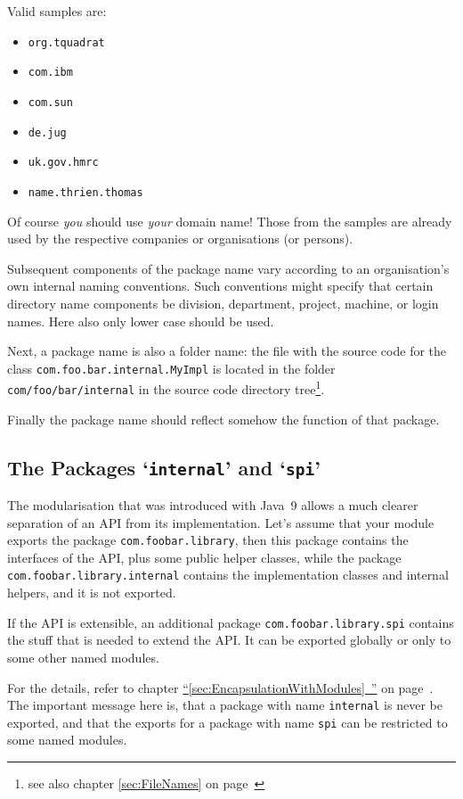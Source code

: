 \documentclass[11pt,a4paper, titlepage, parskip=half, headsepline, footsepline, cleardoublepage=current, headheight=1cm]{scrbook}
\newcommand*{\tqfullvref}[1]{\hyperref[{#1}]{“\ref*{#1}~\nameref*{#1}”} on page~\pageref{#1}}
\newcommand*{\tqvref}[1]{\hyperref[{#1}]{\ref*{#1}} on page~\pageref{#1}}
\begin{document}
Valid samples are:
\begin{itemize}[nosep]
\item\verb#org.tquadrat#
\item\verb#com.ibm#
\item\verb#com.sun#
\item\verb#de.jug#
\item\verb#uk.gov.hmrc#
\item\verb#name.thrien.thomas#
\end{itemize}

Of course \textit{you} should use \textit{your} domain name! Those from the samples are already used by the respective companies or organisations (or persons).

Subsequent components of the package name vary according to an organisation's own internal naming conventions. Such conventions might specify that certain directory name components be division, department, project, machine, or login names. Here also only lower case should be used.

Next, a package name is also a folder name: the file with the source code for the class \lstinline|com.foo.bar.internal.MyImpl| is located in the folder \verb#com/foo/bar/internal# in the source code directory tree\footnote{see also chapter \tqvref{sec:FileNames}}.

Finally the package name should reflect somehow the function of that package.


\subsection{The Packages ‘\lstinline|internal|’ and ‘\lstinline|spi|’}
The modularisation that was introduced with Java~9 allows a much clearer separation of an API from its implementation. Let's assume that your module exports the package \lstinline|com.foobar.library|, then this package contains the interfaces of the API, plus some public helper classes, while the package \lstinline|com.foobar.library.internal| contains the implementation classes and internal helpers, and it is not exported.

If the API is extensible, an additional package \lstinline|com.foobar.library.spi| contains the stuff that is needed to extend the API. It can be exported globally or only to some other named modules.

For the details, refer to chapter \tqfullvref{sec:EncapsulationWithModules}. The important message here is, that a package with name \verb#internal# is never be exported, and that the exports for a package with name \verb#spi# can be restricted to some named modules.
\end{document}
